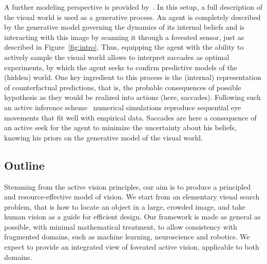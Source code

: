 A further modeling perspective is provided by~\cite{Friston12}. In this setup, a full description of the visual world is used as a generative process. An agent is completely described by the generative model governing the dynamics of its internal beliefs and is interacting with this image by scanning it through a foveated sensor, just as described in Figure~\ref{fig:intro}. Thus, equipping the agent with the ability to actively sample the visual world %
allows to interpret saccades as optimal experiments, by which the agent seeks to confirm predictive models of the (hidden) world. One key ingredient to this process is the (internal) representation of counterfactual predictions, that is, the probable consequences of possible hypothesis as they would be realized into actions (here, saccades). Following such an active inference scheme~\cite{Mirza18} numerical simulations reproduce sequential eye movements that fit well with empirical data. %
Saccades %
are here a consequence of an active seek for the agent to minimize the uncertainty about his beliefs, knowing his priors on the generative model of the visual world. 

\subsection*{Outline}


Stemming from the active vision principles, our aim is to produce a principled and resource-effective model of vision. 
We start from an elementary visual search problem, that is how to locate an object in a large, crowded image, and take human vision as a guide for efficient design. Our framework is made as general as possible, with minimal mathematical treatment, to allow consistency with fragmented domains, such as machine learning, neuroscience and robotics. We expect to provide an integrated view of foveated active vision, applicable to both domains. 

